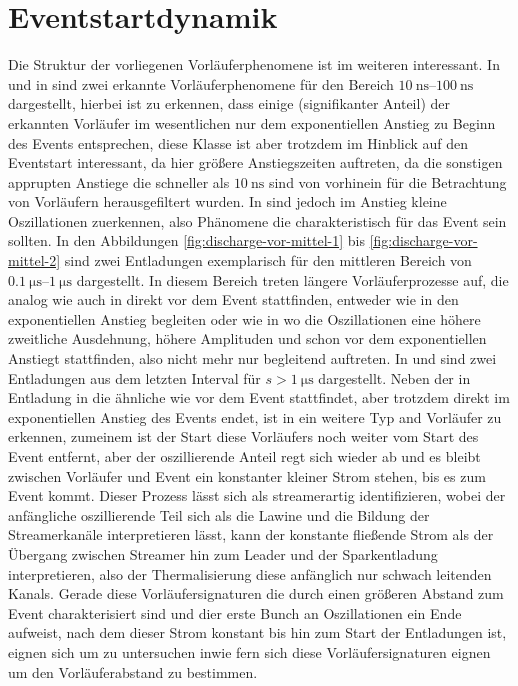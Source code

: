 \section{Eventstartdynamik}


Die Struktur der vorliegenen Vorläuferphenomene ist im weiteren interessant. In  und in  sind zwei erkannte Vorläuferphenomene für den Bereich \(\SIrange{10}{100}{\nano\second}\) dargestellt, hierbei ist zu erkennen, dass einige (signifikanter Anteil) der erkannten Vorläufer im wesentlichen nur dem exponentiellen Anstieg zu Beginn des Events entsprechen, diese Klasse ist aber trotzdem im Hinblick auf den Eventstart interessant, da hier größere Anstiegszeiten auftreten, da die sonstigen apprupten Anstiege die schneller als \(\SI{10}{\nano\second}\) sind von vorhinein für die Betrachtung von Vorläufern herausgefiltert wurden. In  sind jedoch im Anstieg kleine Oszillationen zuerkennen, also Phänomene die charakteristisch für das Event sein sollten. In den Abbildungen \ref{fig:discharge-vor-mittel-1} bis \ref{fig:discharge-vor-mittel-2} sind zwei Entladungen exemplarisch für den mittleren Bereich von \(\SIrange{0,1}{1}{\micro\second}\) dargestellt. In diesem Bereich treten längere Vorläuferprozesse auf, die analog wie auch in  direkt vor dem Event stattfinden, entweder wie in  den exponentiellen Anstieg begleiten oder wie in  wo die Oszillationen eine höhere zweitliche Ausdehnung, höhere Amplituden und schon vor dem exponentiellen Anstiegt stattfinden, also nicht mehr nur begleitend auftreten. In  und  sind zwei Entladungen aus dem letzten Interval für \(s > \SI{1}{\micro\second}\) dargestellt. Neben der in Entladung in  die ähnliche wie  vor dem Event stattfindet, aber trotzdem direkt im exponentiellen Anstieg des Events endet, ist in  ein weitere Typ and Vorläufer zu erkennen, zumeinem ist der Start diese Vorläufers noch weiter vom Start des Event entfernt, aber der oszillierende Anteil regt sich wieder ab und es bleibt zwischen Vorläufer und Event ein konstanter kleiner Strom stehen, bis es zum Event kommt. Dieser Prozess lässt sich als streamerartig identifizieren, wobei der anfängliche oszillierende Teil sich als die Lawine und die Bildung der Streamerkanäle interpretieren lässt, kann der konstante fließende Strom als der Übergang zwischen Streamer hin zum Leader und der Sparkentladung interpretieren, also der Thermalisierung diese anfänglich nur schwach leitenden Kanals. Gerade diese Vorläufersignaturen die durch einen größeren Abstand zum Event charakterisiert sind und dier erste Bunch an Oszillationen ein Ende aufweist, nach dem dieser Strom konstant bis hin zum Start der Entladungen ist, eignen sich um zu untersuchen inwie fern sich diese Vorläufersignaturen eignen um den Vorläuferabstand zu bestimmen. 

